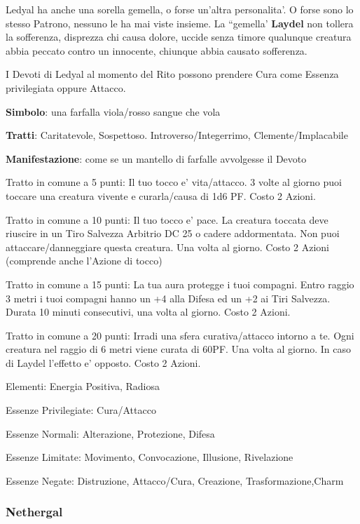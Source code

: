 \documentclass[a4paper,11pt,twoside,openany]{dndbook}
\begin{document}
{Ledyal ha anche una sorella gemella, o forse un'altra personalita'. O forse sono lo stesso Patrono, nessuno le ha mai viste insieme. La ``gemella' \textbf{Laydel} non tollera la sofferenza, disprezza chi causa dolore, uccide senza timore qualunque creatura abbia peccato contro un innocente, chiunque abbia causato sofferenza.

I Devoti di Ledyal al momento del Rito possono prendere Cura come Essenza privilegiata oppure Attacco.

\textbf{Simbolo}: una farfalla viola/rosso sangue che vola

\textbf{Tratti}: Caritatevole, Sospettoso. Introverso/Integerrimo, Clemente/Implacabile

\textbf{Manifestazione}: come se un mantello di farfalle avvolgesse il Devoto

\bigskip

Tratto in comune a 5 punti: Il tuo tocco e' vita/attacco. 3 volte al giorno puoi toccare una creatura vivente e curarla/causa di 1d6 PF. Costo 2 Azioni.

Tratto in comune a 10 punti: Il tuo tocco e' pace. La creatura toccata deve riuscire in un Tiro Salvezza Arbitrio DC 25 o cadere addormentata. Non puoi attaccare/danneggiare questa creatura. Una volta al giorno. Costo 2 Azioni (comprende anche l'Azione di tocco)

Tratto in comune a 15 punti: La tua aura protegge i tuoi compagni. Entro raggio 3 metri i tuoi compagni hanno un +4 alla Difesa ed un +2 ai Tiri Salvezza. Durata 10 minuti consecutivi, una volta al giorno. Costo 2 Azioni.

Tratto in comune a 20 punti: Irradi una sfera curativa/attacco intorno a te. Ogni creatura nel raggio di 6 metri viene curata di 60PF. Una volta al giorno. In caso di Laydel l'effetto e' opposto. Costo 2 Azioni.

\bigskip

Elementi: Energia Positiva, Radiosa

\bigskip

Essenze Privilegiate: Cura/Attacco

Essenze Normali: Alterazione, Protezione, Difesa

Essenze Limitate: Movimento, Convocazione, Illusione, Rivelazione

Essenze Negate: Distruzione, Attacco/Cura, Creazione, Trasformazione,Charm

\subsubsection{Nethergal}

}
\end{document}
